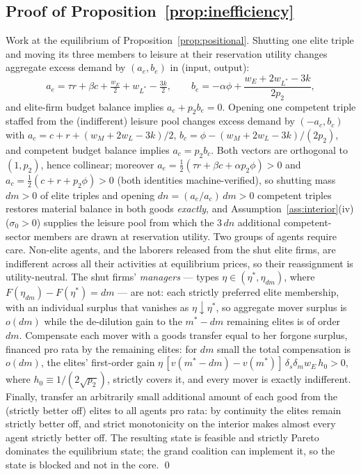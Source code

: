\documentclass[12pt,letterpaper]{article}
\theoremstyle{definition}
\begin{document}
\subsection{Proof of Proposition~\ref{prop:inefficiency}} Work at the equilibrium of Proposition~\ref{prop:positional}.
Shutting one elite triple and moving its three members to leisure at their reservation utility changes aggregate excess demand by $(a_e,b_e)$ in (input, output): \[ a_e = \tau r + \beta c + \tfrac{w_E}{2} + w_{L^\ast} - \tfrac{3k}{2},
\qquad
b_e = -\alpha\phi + \frac{w_E + 2w_{L^\ast} - 3k}{2p_2}, \] and elite-firm budget balance implies $a_e + p_2 b_e = 0$.
Opening one competent triple staffed from the (indifferent) leisure pool changes excess demand by $(-a_c, b_c)$ with $a_c = c + r + (w_M+2w_L-3k)/2$, $b_c = \phi - (w_M+2w_L-3k)/(2p_2)$, and competent budget balance implies $a_c = p_2 b_c$.
Both vectors are orthogonal to $(1,p_2)$, hence collinear; moreover $a_e = \tfrac12(\tau r+\beta c+\alpha p_2\phi)>0$ and $a_c = \tfrac12(c+r+p_2\phi)>0$ (both identities machine-verified), so shutting mass $dm>0$ of elite triples and opening $dn = (a_e/a_c)\,dm>0$ competent triples restores material balance in both goods \emph{exactly}, and Assumption~\ref{ass:interior}(iv) ($\sigma_0>0$) supplies the leisure pool from which the $3\,dn$ additional competent-sector members are drawn at reservation utility.
Two groups of agents require care.
Non-elite agents, and the laborers released from the shut elite firms, are indifferent across all their activities at equilibrium prices, so their reassignment is utility-neutral.
The shut firms' \emph{managers} --- types $\eta\in(\eta^\ast,\eta_{dm})$, where $F(\eta_{dm})-F(\eta^\ast)=dm$ --- are not: each strictly preferred elite membership, with an individual surplus that vanishes as $\eta\downarrow\eta^\ast$, so aggregate mover surplus is $o(dm)$ while the de-dilution gain to the $m^\ast-dm$ remaining elites is of order $dm$.
Compensate each mover with a goods transfer equal to her forgone surplus, financed pro rata by the remaining elites: for $dm$ small the total compensation is $o(dm)$, the elites' first-order gain $\eta\,[v(m^\ast-dm)-v(m^\ast)]\,\delta_s\delta_m w_E\,h_0>0$, where $h_0\equiv 1/(2\sqrt{p_2})$, strictly covers it, and every mover is exactly indifferent.
Finally, transfer an arbitrarily small additional amount of each good from the (strictly better off) elites to all agents pro rata: by continuity the elites remain strictly better off, and strict monotonicity on the interior makes almost every agent strictly better off.
The resulting state is feasible and strictly Pareto dominates the equilibrium state; the grand coalition can implement it, so the state is blocked and not in the core.
\qed
\end{document}
